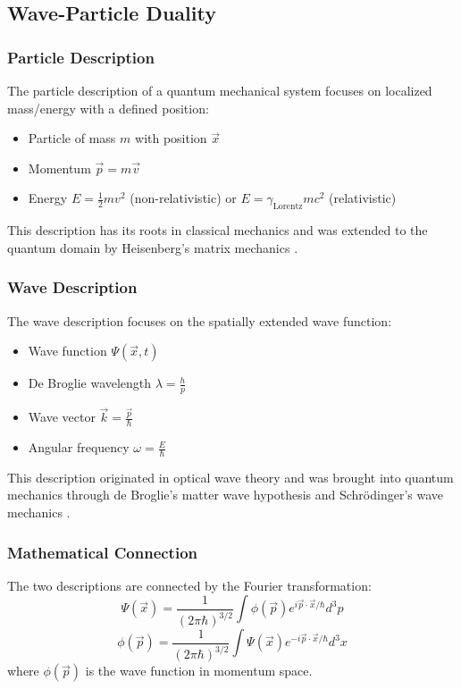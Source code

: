 \documentclass[a4paper,12pt]{article}
\newcommand{\vecx}{\vec{x}}
\newcommand{\gammaf}{\gamma_{\text{Lorentz}}}
\begin{document}
	\subsection{Wave-Particle Duality}
	
	\subsubsection{Particle Description}
	The particle description of a quantum mechanical system focuses on localized mass/energy with a defined position:
	\begin{itemize}[leftmargin=*,nosep]
		\item Particle of mass $m$ with position $\vecx$
		\item Momentum $\vec{p} = m\vec{v}$
		\item Energy $E = \frac{1}{2}mv^2$ (non-relativistic) or $E = \gammaf mc^2$ (relativistic)
	\end{itemize}
	
	This description has its roots in classical mechanics and was extended to the quantum domain by Heisenberg's matrix mechanics \cite{Heisenberg1925}.
	
	\subsubsection{Wave Description}
	The wave description focuses on the spatially extended wave function:
	\begin{itemize}[leftmargin=*,nosep]
		\item Wave function $\Psi(\vecx,t)$
		\item De Broglie wavelength $\lambda = \frac{h}{p}$
		\item Wave vector $\vec{k} = \frac{\vec{p}}{\hbar}$
		\item Angular frequency $\omega = \frac{E}{\hbar}$
	\end{itemize}
	
	This description originated in optical wave theory and was brought into quantum mechanics through de Broglie's matter wave hypothesis \cite{deBroglie1923} and Schrödinger's wave mechanics \cite{Schrodinger1926}.
	
	\subsubsection{Mathematical Connection}
	The two descriptions are connected by the Fourier transformation:
	\[
	\Psi(\vecx) = \frac{1}{(2\pi\hbar)^{3/2}} \int \phi(\vec{p}) e^{i\vec{p}\cdot\vecx/\hbar} d^3p
	\]
	\[
	\phi(\vec{p}) = \frac{1}{(2\pi\hbar)^{3/2}} \int \Psi(\vecx) e^{-i\vec{p}\cdot\vecx/\hbar} d^3x
	\]
	where $\phi(\vec{p})$ is the wave function in momentum space.
	
\end{document}
